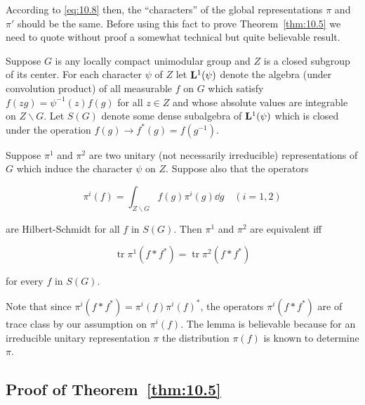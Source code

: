 According to \eqref{eq:10.8} then, the ``characters'' of the global representations $\pi$ and $\pi'$ should be the same. Before using this fact to prove Theorem~\ref{thm:10.5} we need to quote without proof a somewhat technical but quite believable result.

Suppose $G$ is any locally compact unimodular group and $Z$ is a closed subgroup of its center. For each character $\psi$ of $Z$ let $\mathbf{L}^1(\psi)$ denote the algebra (under convolution product) of all measurable $f$ on $G$ which satisfy $f(zg) = \psi^{-1}(z)f(g)$ for all $z \in Z$ and whose absolute values are integrable on $Z \backslash G$. Let $S(G)$ denote some dense subalgebra of $\mathbf{L}^1(\psi)$ which is closed under the operation $f(g) \to f^*(g) = f(g^{-1})$.

\begin{lemma}\label{lem:10.6}

Suppose $\pi^1$ and $\pi^2$ are two unitary (not necessarily irreducible) representations of $G$ which induce the character $\psi$ on $Z$. Suppose also that the operators

\[
\pi^i(f) = \int_{Z \backslash G} f(g)\pi^i(g) \dd g \quad (i = 1, 2)
\]

are Hilbert-Schmidt for all $f$ in $S(G)$. Then $\pi^1$ and $\pi^2$ are equivalent iff

\begin{equation}\label{eq:10.9}
\operatorname{tr} \pi^1(f * f^*) = \operatorname{tr} \pi^2(f * f^*)\tag{10.9}
\end{equation}

for every $f$ in $S(G)$.

\end{lemma}

Note that since $\pi^i(f * f^*) = \pi^i(f)\pi^i(f)^*$, the operators $\pi^i(f * f^*)$ are of trace class by our assumption on $\pi^i(f)$. The lemma is believable because for an irreducible unitary representation $\pi$ the distribution $\pi(f)$ is known to determine $\pi$.

\subsection*{Proof of Theorem~\ref{thm:10.5}}

